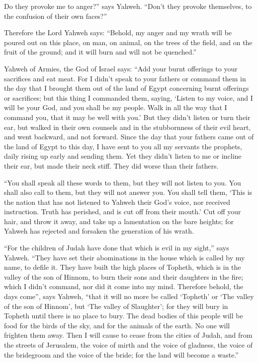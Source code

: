 {Do they provoke me to anger?” says Yahweh. “Don’t they provoke themselves, to the confusion of their own faces?”
\par }{\PP {}Therefore the Lord Yahweh says: “Behold, my anger and my wrath will be poured out on this place, on man, on animal, on the trees of the field, and on the fruit of the ground; and it will burn and will not be quenched.”
\par }{\PP {}Yahweh of Armies, the God of Israel says: “Add your burnt offerings to your sacrifices and eat meat.
For I didn’t speak to your fathers or command them in the day that I brought them out of the land of Egypt concerning burnt offerings or sacrifices;
but this thing I commanded them, saying, ‘Listen to my voice, and I will be your God, and you shall be my people. Walk in all the way that I command you, that it may be well with you.’
But they didn’t listen or turn their ear, but walked in their own counsels and in the stubbornness of their evil heart, and went backward, and not forward.
Since the day that your fathers came out of the land of Egypt to this day, I have sent to you all my servants the prophets, daily rising up early and sending them.
Yet they didn’t listen to me or incline their ear, but made their neck stiff. They did worse than their fathers.
\par }{\PP {}“You shall speak all these words to them, but they will not listen to you. You shall also call to them, but they will not answer you.
You shall tell them, ‘This is the nation that has not listened to Yahweh their God’s voice, nor received instruction. Truth has perished, and is cut off from their mouth.’
Cut off your hair, and throw it away, and take up a lamentation on the bare heights; for Yahweh has rejected and forsaken the generation of his wrath.
\par }{\PP {}“For the children of Judah have done that which is evil in my sight,” says Yahweh. “They have set their abominations in the house which is called by my name, to defile it.
They have built the high places of Topheth, which is in the valley of the son of Hinnom, to burn their sons and their daughters in the fire; which I didn’t command, nor did it come into my mind.
Therefore behold, the days come”, says Yahweh, “that it will no more be called ‘Topheth’ or ‘The valley of the son of Hinnom’, but ‘The valley of Slaughter’; for they will bury in Topheth until there is no place to bury.
The dead bodies of this people will be food for the birds of the sky, and for the animals of the earth. No one will frighten them away.
Then I will cause to cease from the cities of Judah, and from the streets of Jerusalem, the voice of mirth and the voice of gladness, the voice of the bridegroom and the voice of the bride; for the land will become a waste.”

}

